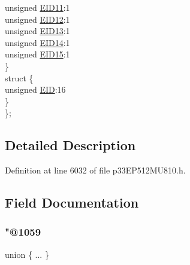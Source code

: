 \begin{DoxyCompactItemize}
\begin{tabbing}
\>\>unsigned \hyperlink{structtag_c2_r_x_m1_e_i_d_b_i_t_s_a710bdb0d602deb021b0be99066008018}{EID11}:1\\
\>\>unsigned \hyperlink{structtag_c2_r_x_m1_e_i_d_b_i_t_s_aa347bb85867bd8d4e0124f7cff8c6472}{EID12}:1\\
\>\>unsigned \hyperlink{structtag_c2_r_x_m1_e_i_d_b_i_t_s_a37d5f3edcbf6ef62f848fd4f3c584f79}{EID13}:1\\
\>\>unsigned \hyperlink{structtag_c2_r_x_m1_e_i_d_b_i_t_s_a7ffc0b0e0d99b8476b6f9a45337c17ab}{EID14}:1\\
\>\>unsigned \hyperlink{structtag_c2_r_x_m1_e_i_d_b_i_t_s_a293cd7dc1746257fa75a60cbd9383cd7}{EID15}:1\\
\>\} \\
\>struct \{\\
\>\>unsigned \hyperlink{structtag_c2_r_x_m1_e_i_d_b_i_t_s_ae80b378c9141f7c03e0b4e55b5f4b54d}{EID}:16\\
\>\} \\
\}; \\

\end{tabbing}\end{DoxyCompactItemize}


\subsection{Detailed Description}


Definition at line 6032 of file p33\+E\+P512\+M\+U810.\+h.



\subsection{Field Documentation}
\mbox{\label{structtag_c2_r_x_m1_e_i_d_b_i_t_s_a806b06fd534103b9fcab5fbdc9722602}} 
\subsubsection{\texorpdfstring{"@1059}{@1059}}
{\footnotesize\ttfamily union \{ ... \} }

\mbox{\label{structtag_c2_r_x_m1_e_i_d_b_i_t_s_ae80b378c9141f7c03e0b4e55b5f4b54d}} 
